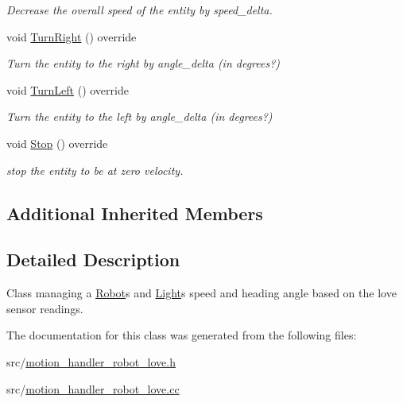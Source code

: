 \begin{DoxyCompactItemize}
\begin{DoxyCompactList}\small\item\em Decrease the overall speed of the entity by speed\+\_\+delta. \end{DoxyCompactList}\item 
void \hyperlink{class_motion_handler_robot_love_aeff4a675940af2d42c6a8fd2a4519d66}{Turn\+Right} () override\hypertarget{class_motion_handler_robot_love_aeff4a675940af2d42c6a8fd2a4519d66}{}\label{class_motion_handler_robot_love_aeff4a675940af2d42c6a8fd2a4519d66}

\begin{DoxyCompactList}\small\item\em Turn the entity to the right by angle\+\_\+delta (in degrees?) \end{DoxyCompactList}\item 
void \hyperlink{class_motion_handler_robot_love_a26b07483889261be22d5df90d2bdf81c}{Turn\+Left} () override\hypertarget{class_motion_handler_robot_love_a26b07483889261be22d5df90d2bdf81c}{}\label{class_motion_handler_robot_love_a26b07483889261be22d5df90d2bdf81c}

\begin{DoxyCompactList}\small\item\em Turn the entity to the left by angle\+\_\+delta (in degrees?) \end{DoxyCompactList}\item 
void \hyperlink{class_motion_handler_robot_love_aaff39b4c62e5c46743bc65af94e9a09a}{Stop} () override\hypertarget{class_motion_handler_robot_love_aaff39b4c62e5c46743bc65af94e9a09a}{}\label{class_motion_handler_robot_love_aaff39b4c62e5c46743bc65af94e9a09a}

\begin{DoxyCompactList}\small\item\em stop the entity to be at zero velocity. \end{DoxyCompactList}\end{DoxyCompactItemize}
\subsection*{Additional Inherited Members}


\subsection{Detailed Description}
Class managing a \hyperlink{class_robot}{Robot}\textquotesingle{}s and \hyperlink{class_light}{Light}\textquotesingle{}s speed and heading angle based on the love sensor readings. 

The documentation for this class was generated from the following files\+:\begin{DoxyCompactItemize}
\item 
src/\hyperlink{motion__handler__robot__love_8h}{motion\+\_\+handler\+\_\+robot\+\_\+love.\+h}\item 
src/\hyperlink{motion__handler__robot__love_8cc}{motion\+\_\+handler\+\_\+robot\+\_\+love.\+cc}\end{DoxyCompactItemize}
